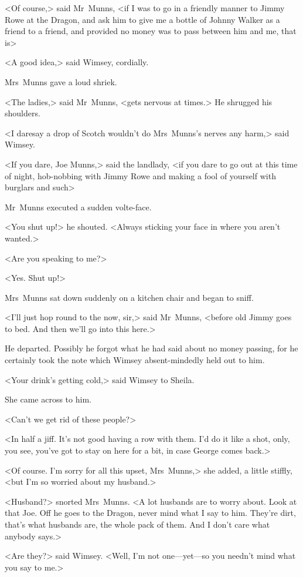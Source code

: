 <Of course,> said Mr~Munns, <if I was to go in a friendly manner to Jimmy Rowe at the Dragon, and ask him to give me a bottle of Johnny Walker as a friend to a friend, and provided no money was to pass between him and me, that is\longdash>

<A good idea,> said Wimsey, cordially.

Mrs~Munns gave a loud shriek.

<The ladies,> said Mr~Munns, <gets nervous at times.> He shrugged his shoulders.

<I daresay a drop of Scotch wouldn't do Mrs~Munns's nerves any harm,> said Wimsey.

<If you dare, Joe Munns,> said the landlady, <if you dare to go out at this time of night, hob-nobbing with Jimmy Rowe and making a fool of yourself with burglars and such\longdash>

Mr~Munns executed a sudden volte-face.

<You shut up!> he shouted. <Always sticking your face in where you aren't wanted.>

<Are you speaking to me?>

<Yes. Shut up!>

Mrs~Munns sat down suddenly on a kitchen chair and began to sniff.

<I'll just hop round to the  now, sir,> said Mr~Munns, <before old Jimmy goes to bed. And then we'll go into this here.>

He departed. Possibly he forgot what he had said about no money passing, for he certainly took the note which Wimsey absent-mindedly held out to him.

<Your drink's getting cold,> said Wimsey to Sheila.

She came across to him.

<Can't we get rid of these people?>

<In half a jiff. It's not good having a row with them. I'd do it like a shot, only, you see, you've got to stay on here for a bit, in case George comes back.>

<Of course. I'm sorry for all this upset, Mrs~Munns,> she added, a little stiffly, <but I'm so worried about my husband.>

<Husband?> snorted Mrs~Munns. <A lot husbands are to worry about. Look at that Joe. Off he goes to the Dragon, never mind what I say to him. They're dirt, that's what husbands are, the whole pack of them. And I don't care what anybody says.>

<Are they?> said Wimsey. <Well, I'm not one—yet—so you needn't mind what you say to me.>

